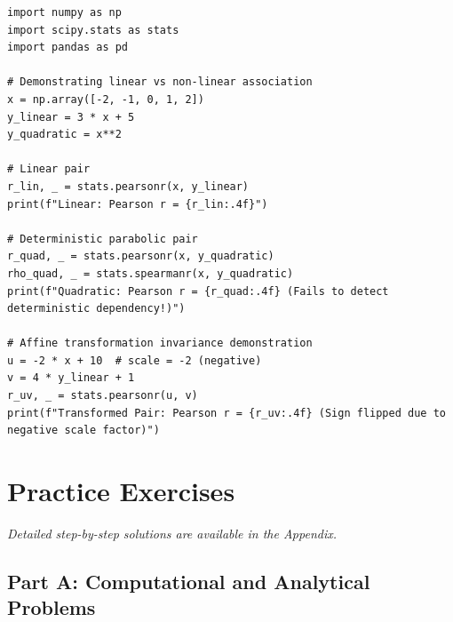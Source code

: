 \begin{lstlisting}[caption={Bivariate Association, Pearson, and Spearman in Python}]
import numpy as np
import scipy.stats as stats
import pandas as pd

# Demonstrating linear vs non-linear association
x = np.array([-2, -1, 0, 1, 2])
y_linear = 3 * x + 5
y_quadratic = x**2

# Linear pair
r_lin, _ = stats.pearsonr(x, y_linear)
print(f"Linear: Pearson r = {r_lin:.4f}")

# Deterministic parabolic pair
r_quad, _ = stats.pearsonr(x, y_quadratic)
rho_quad, _ = stats.spearmanr(x, y_quadratic)
print(f"Quadratic: Pearson r = {r_quad:.4f} (Fails to detect deterministic dependency!)")

# Affine transformation invariance demonstration
u = -2 * x + 10  # scale = -2 (negative)
v = 4 * y_linear + 1
r_uv, _ = stats.pearsonr(u, v)
print(f"Transformed Pair: Pearson r = {r_uv:.4f} (Sign flipped due to negative scale factor)")
\end{lstlisting}

\newpage
\section{Practice Exercises}
\textit{Detailed step-by-step solutions are available in the Appendix.}

\subsection*{Part A: Computational and Analytical Problems}

